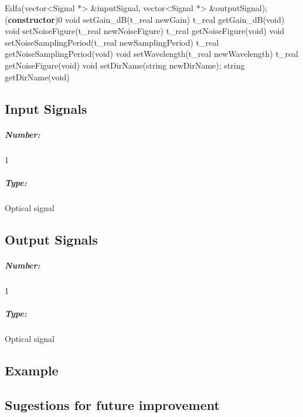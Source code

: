 Edfa(vector<Signal *> \&inputSignal, vector<Signal *> \&outputSignal); 
(\textbf{constructor})0
\bigbreak
void setGain\_dB(t\_real newGain)
\bigbreak
t\_real getGain\_dB(void)
\bigbreak
void setNoiseFigure(t\_real newNoiseFigure)
\bigbreak
t\_real getNoiseFigure(void)
\bigbreak
void setNoiseSamplingPeriod(t\_real newSamplingPeriod)
\bigbreak
t\_real getNoiseSamplingPeriod(void)
\bigbreak
void setWavelength(t\_real newWavelength)
\bigbreak
t\_real getNoiseFigure(void)
\bigbreak
void setDirName(string newDirName);
\bigbreak
string getDirName(void)
\bigbreak
%

\subsection*{Input Signals}

\subparagraph*{Number:} 1

\subparagraph*{Type:} Optical signal

\subsection*{Output Signals}

\subparagraph*{Number:} 1

\subparagraph*{Type:} Optical signal

\subsection*{Example}

\subsection*{Sugestions for future improvement}

